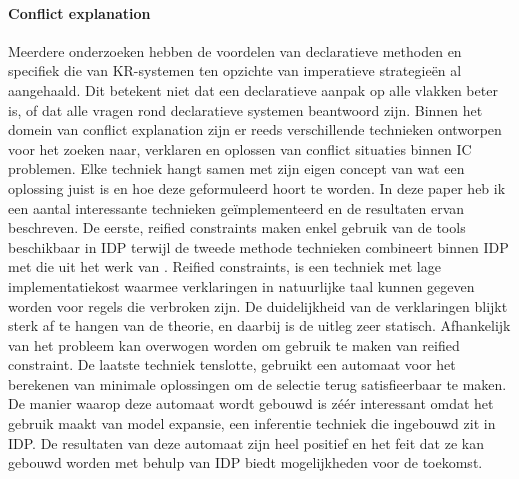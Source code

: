 \paragraph{Conflict explanation}
Meerdere onderzoeken hebben de voordelen van declaratieve methoden \cite{gelle1996interactive} en specifiek die van KR-systemen \cite{de2014predicate} \cite{denecker2008building} \cite{van2016kb} \cite{vlaeminck2009logical} ten opzichte van imperatieve strategie\"{e}n al aangehaald. Dit betekent niet dat een declaratieve aanpak op alle vlakken beter is, of dat alle vragen rond declaratieve systemen beantwoord zijn. Binnen het domein van conflict explanation zijn er reeds verschillende technieken ontworpen voor het zoeken naar, verklaren en oplossen van conflict situaties binnen IC problemen. Elke techniek hangt samen met zijn eigen concept van wat een oplossing juist is en hoe deze geformuleerd hoort te worden. In deze paper heb ik een aantal interessante technieken ge\"{i}mplementeerd en de resultaten ervan beschreven. De eerste, reified constraints maken enkel gebruik van de tools beschikbaar in IDP terwijl de tweede methode technieken combineert binnen IDP met die uit het werk van \citep{amilhastre2002consistency}. Reified constraints, is een techniek met lage implementatiekost waarmee verklaringen in natuurlijke taal kunnen gegeven worden voor regels die verbroken zijn. De duidelijkheid van de verklaringen blijkt sterk af te hangen van de theorie, en daarbij is de uitleg zeer statisch. Afhankelijk van het probleem kan overwogen worden om gebruik te maken van reified constraint. De laatste techniek tenslotte, gebruikt een automaat voor het berekenen van minimale oplossingen om de selectie terug satisfieerbaar te maken. De manier waarop deze automaat wordt gebouwd is z\'{e}\'{e}r interessant omdat het gebruik maakt van model expansie, een inferentie techniek die ingebouwd zit in IDP. De resultaten van deze automaat zijn heel positief en het feit dat ze kan gebouwd worden met behulp van IDP biedt mogelijkheden voor de toekomst. 

